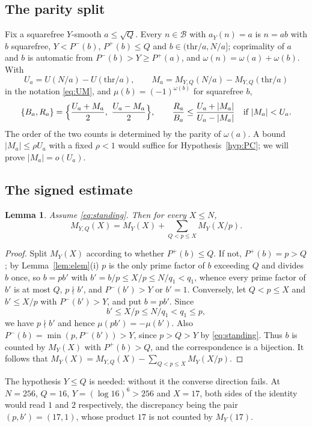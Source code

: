\documentclass[11pt,a4paper]{article}
\theoremstyle{plain}
\newtheorem{lemma}[theorem]{Lemma}
\theoremstyle{definition}
\theoremstyle{remark}
\newcommand{\Pp}{P^{+}}
\newcommand{\Pm}{P^{-}}
\newcommand{\thr}{\mathrm{thr}}
\newcommand{\band}{\mathcal{B}}
\begin{document}
\subsection{The parity split}\label{sec:split}
Fix a squarefree $Y$-smooth $a\le\sqrt Q$. Every $n\in\band$ with $a_{Y}(n)=a$ is $n=ab$ with $b$
squarefree, $Y<\Pm(b)$, $\Pp(b)\le Q$ and $b\in(\thr/a,N/a]$; coprimality of $a$ and $b$ is automatic from
$\Pm(b)>Y\ge\Pp(a)$, and $\omega(n)=\omega(a)+\omega(b)$. With
\[
  U_{a}=U(N/a)-U(\thr/a),\qquad M_{a}=M_{Y,Q}(N/a)-M_{Y,Q}(\thr/a)
\]
in the notation \eqref{eq:UM}, and $\mu(b)=(-1)^{\omega(b)}$ for squarefree $b$,
\begin{equation}\label{eq:par}
  \{B_{a},R_{a}\}=\Bigl\{\frac{U_{a}+M_{a}}2,\ \frac{U_{a}-M_{a}}2\Bigr\},\qquad
  \frac{R_{a}}{B_{a}}\le\frac{U_{a}+|M_{a}|}{U_{a}-|M_{a}|}\quad\text{if }|M_{a}|<U_{a}.
\end{equation}
The order of the two counts is determined by the parity of $\omega(a)$.
A bound $|M_a|\le\rho U_a$ with a fixed $\rho<1$ would suffice for Hypothesis~\ref{hyp:PC};
we will prove $|M_a|=o(U_a)$.

\subsection{The signed estimate}\label{sec:signed}

\begin{lemma}\label{lem:1LP}
Assume \eqref{eq:standing}. Then for every $X\le N$,
\[
  M_{Y,Q}(X)=M_{Y}(X)+\sum_{Q<p\le X}M_{Y}(X/p).
\]
\end{lemma}

\begin{proof}
Split $M_{Y}(X)$ according to whether $\Pp(b)\le Q$. If not, $\Pp(b)=p>Q$; by Lemma~\ref{lem:elem}(i) $p$
is the only prime factor of $b$ exceeding $Q$ and divides $b$ once, so $b=pb'$ with
$b'=b/p\le X/p\le N/q_{1}<q_{1}$, whence every prime factor of $b'$ is at most $Q$, $p\nmid b'$, and
$\Pm(b')>Y$ or $b'=1$. Conversely, let $Q<p\le X$ and $b'\le X/p$ with $\Pm(b')>Y$, and put $b=pb'$.
Since
\[
  b'\le X/p\le N/q_1<q_1\le p,
\]
we have $p\nmid b'$ and hence $\mu(pb')=-\mu(b')$.
Also $\Pm(b)=\min(p,\Pm(b'))>Y$, since $p>Q>Y$ by \eqref{eq:standing}.
Thus $b$ is counted by $M_Y(X)$ with $\Pp(b)>Q$, and the correspondence is a bijection. It follows that
$M_Y(X)=M_{Y,Q}(X)-\sum_{Q<p\le X}M_Y(X/p)$.
\end{proof}

The hypothesis $Y\le Q$ is needed: without it the converse direction fails. At $N=256$, $Q=16$,
$Y=(\log16)^{6}>256$ and $X=17$, both sides of the identity would read $1$ and $2$ respectively, the
discrepancy being the pair $(p,b')=(17,1)$, whose product $17$ is not counted by $M_{Y}(17)$.
\end{document}
